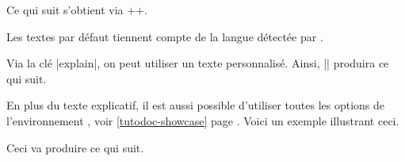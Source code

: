 \documentclass[10pt, a4paper, theme = color]{tutodoc}
\begin{document}
\begin{tdocexa}
    Ce qui suit s'obtient via \tdocinlatex++.

    \medskip

    \begin{tdocshowcaseDOC}
    \end{tdocshowcaseDOC}
\end{tdocexa}


\begin{tdocnote}
    Les textes par défaut tiennent compte de la langue détectée par \thisproj.
\end{tdocnote}


\begin{tdocexa}
    Via la clé \tdocinlatex|explain|, on peut utiliser un texte personnalisé. Ainsi, \tdocinlatex|| produira ce qui suit.

    \medskip

    \begin{tdocshowcaseDOC}
    \end{tdocshowcaseDOC}
\end{tdocexa}


\begin{tdocexa}
    En plus du texte explicatif, il est aussi possible d'utiliser toutes les options de l'environnement , voir \ref{tutodoc-showcase} page \pageref{tutodoc-showcase}.
    Voici un exemple illustrant ceci.

    \medskip


    \medskip

    Ceci va produire ce qui suit.

    \medskip

    \begin{tdocshowcaseDOC}
        
    \end{tdocshowcaseDOC}
\end{tdocexa}
\end{document}
